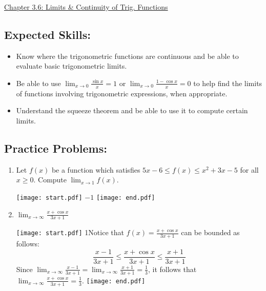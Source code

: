 \documentclass[12pt]{article}
\begin{document}
\begin{center}
\underline{\LARGE{Chapter 3.6: Limits \& Continuity of Trig. Functions}}
\end{center}

\subsection*{Expected Skills:}

\begin{itemize}

\item Know where the trigonometric functions are continuous and be able to evaluate basic trigonometric limits.

\item Be able to use $\lim_{x\rightarrow0}\frac{\sin{x}}{x}=1$ or $\lim_{x \rightarrow 0}\frac{1-\cos{x}}{x}=0$ to help find the limits of functions involving trigonometric expressions, when appropriate.

\item Understand the squeeze theorem and be able to use it to compute certain limits.

\end{itemize}

\subsection*{Practice Problems: }


\begin{enumerate}

\item Let $f(x)$ be a function which satisfies $\displaystyle 5x-6 \leq f(x) \leq x^2+3x-5$ for all $x \geq 0$.  Compute $\displaystyle \lim_{x \rightarrow 1}{f(x)}$.

\texttt{[image: start.pdf]}
{{$-1$}}
\texttt{[image: end.pdf]}


\item $\lim_{x\to\infty} \frac{x+\cos{x}}{3x+1}$

\texttt{[image: start.pdf]}
{{{1\linewidth}{Notice that $f(x)=\frac{x+\cos{x}}{3x+1}$ can be bounded as follows: $$\frac{x-1}{3x+1} \leq \frac{x+\cos{x}}{3x+1} \leq \frac{x+1}{3x+1}$$  Since $\lim_{x\to\infty} \frac{x-1}{3x+1}=\lim_{x\to\infty}  \frac{x+1}{3x+1}=\frac{1}{3}$, it follows that $\lim_{x\to\infty}  \frac{x+\cos{x}}{3x+1}=\frac{1}{3}$.}}}
\texttt{[image: end.pdf]}


\end{enumerate}
\end{document}
